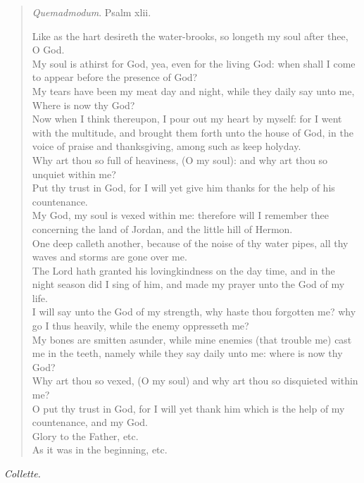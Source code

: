 \documentclass[
]{book}
\begin{document}
\begin{quote}
\emph{Quemadmodum}. Psalm xlii.

Like as the hart desireth the water-brooks, so longeth my soul after thee, O God.\\
My soul is athirst for God, yea, even for the living God: when shall I come to appear before the presence of God?\\
My tears have been my meat day and night, while they daily say unto me, Where is now thy God?\\
Now when I think thereupon, I pour out my heart by myself: for I went with the multitude, and brought them forth unto the house of God, in the voice of praise and thanksgiving, among such as keep holyday.\\
Why art thou so full of heaviness, (O my soul): and why art thou so unquiet within me?\\
Put thy trust in God, for I will yet give him thanks for the help of his countenance.\\
My God, my soul is vexed within me: therefore will I remember thee concerning the land of Jordan, and the little hill of Hermon.\\
One deep calleth another, because of the noise of thy water pipes, all thy waves and storms are gone over me.\\
The Lord hath granted his lovingkindness on the day time, and in the night season did I sing of him, and made my prayer unto the God of my life.\\
I will say unto the God of my strength, why haste thou forgotten me? why go I thus heavily, while the enemy oppresseth me?\\
My bones are smitten asunder, while mine enemies (that trouble me) cast me in the teeth, namely while they say daily unto me: where is now thy God?\\
Why art thou so vexed, (O my soul) and why art thou so disquieted within me?\\
O put thy trust in God, for I will yet thank him which is the help of my countenance, and my God.\\
Glory to the Father, etc.\\
As it was in the beginning, etc.
\end{quote}

\emph{Collette.}
\end{document}
